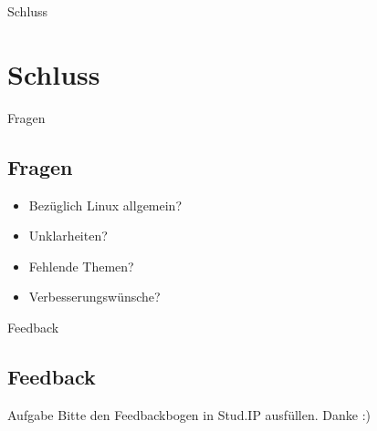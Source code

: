 
\begin{frame}{Schluss}
    \section{Schluss}\label{sec:schluss}
\end{frame}

\begin{frame}{Fragen}
    \subsection{Fragen}\label{subsec:Fragen}
    \pause
    \begin{itemize}
        \item Bezüglich Linux allgemein?\pause
        \item Unklarheiten?\pause
        \item Fehlende Themen?\pause
        \item Verbesserungswünsche?
    \end{itemize}

\end{frame}

\begin{frame}{Feedback}
    \subsection{Feedback}\label{subsec:feedback}

    \vspace{0.5cm}
    \begin{alertblock}{Aufgabe}
        Bitte den Feedbackbogen in Stud.IP ausfüllen.
        \linebreak
        Danke :)
    \end{alertblock}

\end{frame}